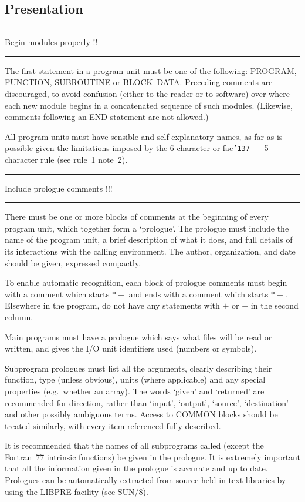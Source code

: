 \documentclass[twoside,11pt]{article}
\newcounter{sruleno}
\newcommand{\srule}[1]{
    \addtocounter{sruleno}{1}
    \goodbreak
    \rule[0.5ex]{\textwidth}{0.3mm}
    {\Large #1 \hfill {\thesruleno}}
    \rule[0.5ex]{\textwidth}{0.1mm}
}
\newcommand{\srule}[1]{
       \addtocounter{sruleno}{1}
       \begin{rawhtml} <HR> \end{rawhtml}
       {\Large \thesruleno}~~~~{\Large #1}
       \begin{rawhtml} <HR> \end{rawhtml}
       \end{tabular}
  }
\renewcommand{\_}{{\tt\char'137}}
\begin{document}
\goodbreak
\subsection{Presentation}

\srule{Begin modules properly !!}
The first statement in a program unit must be one of the
following: PROGRAM,
FUNCTION,
SUBROUTINE or
BLOCK~DATA.  Preceding comments are discouraged,
to avoid confusion (either to the reader or
to software) over where each new module begins in a concatenated
sequence of such modules.  (Likewise, comments following an
END statement are not allowed.)

All program units must have sensible and self explanatory
names, as far as is possible given the limitations imposed by the
6 character or fac\_~+~5 character rule (see rule~1 note~2).

\srule{Include prologue comments !!!}
There must be one or more blocks of comments at the beginning of every program
unit, which together form a `prologue'.
The prologue must include the name of the program unit, a brief description of
what it does, and full details of its interactions with the calling environment.
The author, organization, and date should be given, expressed compactly.

To enable automatic recognition,
each block of prologue comments
must begin with a comment which starts
$\ast+$ and ends with a comment which starts
$\ast-$.  Elsewhere in the program, do not have any statements with
$+$ or $-$ in the second column.

Main programs must have a prologue which says what files will
be read or written, and gives the I/O unit identifiers
used (numbers or symbols).

Subprogram prologues must list all the arguments, clearly describing their
function, type (unless obvious), units (where applicable) and any special
properties (e.g.\ whether an array).
The words `given' and `returned' are recommended for direction, rather than
`input', `output', `source', `destination' and other possibly ambiguous terms.
Access to COMMON blocks should be treated similarly, with every item referenced
fully described.

It is recommended that the names of all subprograms
called (except the Fortran~77 intrinsic functions) be given in the prologue.
It is extremely important that all the information given in the prologue is
accurate and up to date.
Prologues can be automatically extracted from source held in text
libraries by using the LIBPRE facility (see SUN/8).
\end{document}
